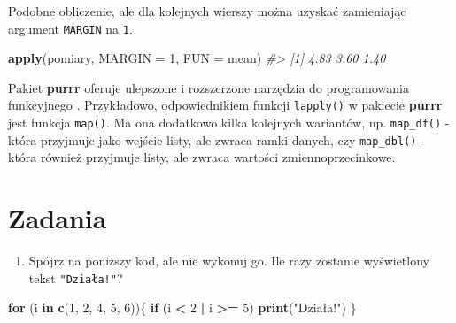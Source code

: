 \documentclass[paper=6in:9in,pagesize=pdftex,headinclude=on,footinclude=on,10pt]{scrbook}
\makeatletter
\newenvironment{Shaded}{\begin{snugshade}}{\end{snugshade}}
\newcommand{\CommentTok}[1]{\textcolor[rgb]{0.56,0.35,0.01}{\textit{#1}}}
\newcommand{\ControlFlowTok}[1]{\textcolor[rgb]{0.13,0.29,0.53}{\textbf{#1}}}
\newcommand{\DataTypeTok}[1]{\textcolor[rgb]{0.13,0.29,0.53}{#1}}
\newcommand{\DecValTok}[1]{\textcolor[rgb]{0.00,0.00,0.81}{#1}}
\newcommand{\KeywordTok}[1]{\textcolor[rgb]{0.13,0.29,0.53}{\textbf{#1}}}
\newcommand{\NormalTok}[1]{#1}
\newcommand{\OperatorTok}[1]{\textcolor[rgb]{0.81,0.36,0.00}{\textbf{#1}}}
\newcommand{\StringTok}[1]{\textcolor[rgb]{0.31,0.60,0.02}{#1}}
\providecommand{\tightlist}{%
  \setlength{\itemsep}{0pt}\setlength{\parskip}{0pt}}
\newenvironment{kframe}{%
\medskip{}
\setlength{\fboxsep}{.8em}
 \def\at@end@of@kframe{}%
 \ifinner\ifhmode%
  \def\at@end@of@kframe{\end{minipage}}%
  \begin{minipage}{\columnwidth}%
 \fi\fi%
 \def\FrameCommand##1{\hskip\@totalleftmargin \hskip-\fboxsep
 \colorbox{shadecolor}{##1}\hskip-\fboxsep
     \hskip-\linewidth \hskip-\@totalleftmargin \hskip\columnwidth}%
 \MakeFramed {\advance\hsize-\width
   \@totalleftmargin\z@ \linewidth\hsize
   \@setminipage}}%
 {\par\unskip\endMakeFramed%
 \at@end@of@kframe}
\newenvironment{rmdblock}[1]
  {
  \begin{itemize}
  \renewcommand{\labelitemi}{
    \raisebox{-.7\height}[0pt][0pt]{
      {\setkeys{Gin}{width=3em,keepaspectratio}\texttt{[image: images/\#1]}}
    }
  }
  \setlength{\fboxsep}{1em}
  \begin{kframe}
  \item
  }
  {
  \end{kframe}
  \end{itemize}
  }
\newenvironment{rmdinfo}
  {\begin{rmdblock}{compass}}
  {\end{rmdblock}}
\makeatother
\begin{document}
Podobne obliczenie, ale dla kolejnych wierszy można uzyskać zamieniając argument \texttt{MARGIN} na \texttt{1}.

\begin{Shaded}
\begin{Highlighting}[]
\KeywordTok{apply}\NormalTok{(pomiary, }\DataTypeTok{MARGIN =} \DecValTok{1}\NormalTok{, }\DataTypeTok{FUN =}\NormalTok{ mean)}
\CommentTok{#> [1] 4.83 3.60 1.40}
\end{Highlighting}
\end{Shaded}

\begin{rmdinfo}
\begin{rmdinfo}

Pakiet \textbf{purrr} oferuje ulepszone i rozszerzone narzędzia do programowania funkcyjnego \citep{R-purrr}.
Przykładowo, odpowiednikiem funkcji \texttt{lapply()} w pakiecie \textbf{purrr} jest funkcja \texttt{map()}.
Ma ona dodatkowo kilka kolejnych wariantów, np. \texttt{map\_df()} - która przyjmuje jako wejście listy, ale zwraca ramki danych, czy \texttt{map\_dbl()} - która również przyjmuje listy, ale zwraca wartości zmiennoprzecinkowe.

\end{rmdinfo}
\end{rmdinfo}

\hypertarget{zadania-7}{%
\section{Zadania}\label{zadania-7}}

\begin{enumerate}
\def\labelenumi{\arabic{enumi})}
\tightlist
\item
  Spójrz na poniższy kod, ale nie wykonuj go.
  Ile razy zostanie wyświetlony tekst \texttt{"Działa!"}?
\end{enumerate}

\begin{Shaded}
\begin{Highlighting}[]
\ControlFlowTok{for}\NormalTok{ (i }\ControlFlowTok{in} \KeywordTok{c}\NormalTok{(}\DecValTok{1}\NormalTok{, }\DecValTok{2}\NormalTok{, }\DecValTok{4}\NormalTok{, }\DecValTok{5}\NormalTok{, }\DecValTok{6}\NormalTok{))\{}
    \ControlFlowTok{if}\NormalTok{ (i }\OperatorTok{<}\StringTok{ }\DecValTok{2} \OperatorTok{|}\StringTok{ }\NormalTok{i }\OperatorTok{>=}\StringTok{ }\DecValTok{5}\NormalTok{)}
      \KeywordTok{print}\NormalTok{(}\StringTok{"Działa!"}\NormalTok{)}
\NormalTok{\}}
\end{Highlighting}
\end{Shaded}
\end{document}
